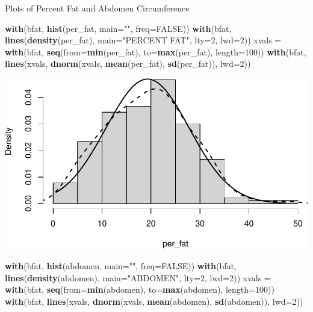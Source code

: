 \documentclass[]{article}
\newenvironment{Shaded}{\begin{snugshade}}{\end{snugshade}}
\newcommand{\KeywordTok}[1]{\textcolor[rgb]{0.13,0.29,0.53}{\textbf{#1}}}
\newcommand{\DataTypeTok}[1]{\textcolor[rgb]{0.13,0.29,0.53}{#1}}
\newcommand{\DecValTok}[1]{\textcolor[rgb]{0.00,0.00,0.81}{#1}}
\newcommand{\StringTok}[1]{\textcolor[rgb]{0.31,0.60,0.02}{#1}}
\newcommand{\OtherTok}[1]{\textcolor[rgb]{0.56,0.35,0.01}{#1}}
\newcommand{\NormalTok}[1]{#1}
\begin{document}
Plots of Percent Fat and Abdomen Circumference

\begin{Shaded}
\begin{Highlighting}[]
\KeywordTok{with}\NormalTok{(bfat, }\KeywordTok{hist}\NormalTok{(per_fat, }\DataTypeTok{main=}\StringTok{""}\NormalTok{, }\DataTypeTok{freq=}\OtherTok{FALSE}\NormalTok{))}
\KeywordTok{with}\NormalTok{(bfat, }\KeywordTok{lines}\NormalTok{(}\KeywordTok{density}\NormalTok{(per_fat), }\DataTypeTok{main=}\StringTok{"PERCENT FAT"}\NormalTok{, }\DataTypeTok{lty=}\DecValTok{2}\NormalTok{, }\DataTypeTok{lwd=}\DecValTok{2}\NormalTok{))}
\NormalTok{xvals =}\StringTok{ }\KeywordTok{with}\NormalTok{(bfat, }\KeywordTok{seq}\NormalTok{(}\DataTypeTok{from=}\KeywordTok{min}\NormalTok{(per_fat), }\DataTypeTok{to=}\KeywordTok{max}\NormalTok{(per_fat), }\DataTypeTok{length=}\DecValTok{100}\NormalTok{))}
\KeywordTok{with}\NormalTok{(bfat, }\KeywordTok{lines}\NormalTok{(xvals, }\KeywordTok{dnorm}\NormalTok{(xvals, }\KeywordTok{mean}\NormalTok{(per_fat), }\KeywordTok{sd}\NormalTok{(per_fat)), }\DataTypeTok{lwd=}\DecValTok{2}\NormalTok{))}
\end{Highlighting}
\end{Shaded}

\includegraphics{BodyFat_files/figure-latex/unnamed-chunk-4-1.pdf}

\begin{Shaded}
\begin{Highlighting}[]
\KeywordTok{with}\NormalTok{(bfat, }\KeywordTok{hist}\NormalTok{(abdomen, }\DataTypeTok{main=}\StringTok{""}\NormalTok{, }\DataTypeTok{freq=}\OtherTok{FALSE}\NormalTok{))}
\KeywordTok{with}\NormalTok{(bfat, }\KeywordTok{lines}\NormalTok{(}\KeywordTok{density}\NormalTok{(abdomen), }\DataTypeTok{main=}\StringTok{"ABDOMEN"}\NormalTok{, }\DataTypeTok{lty=}\DecValTok{2}\NormalTok{, }\DataTypeTok{lwd=}\DecValTok{2}\NormalTok{))}
\NormalTok{xvals =}\StringTok{ }\KeywordTok{with}\NormalTok{(bfat, }\KeywordTok{seq}\NormalTok{(}\DataTypeTok{from=}\KeywordTok{min}\NormalTok{(abdomen), }\DataTypeTok{to=}\KeywordTok{max}\NormalTok{(abdomen), }\DataTypeTok{length=}\DecValTok{100}\NormalTok{))}
\KeywordTok{with}\NormalTok{(bfat, }\KeywordTok{lines}\NormalTok{(xvals, }\KeywordTok{dnorm}\NormalTok{(xvals, }\KeywordTok{mean}\NormalTok{(abdomen), }\KeywordTok{sd}\NormalTok{(abdomen)), }\DataTypeTok{lwd=}\DecValTok{2}\NormalTok{)) }
\end{Highlighting}
\end{Shaded}
\end{document}
